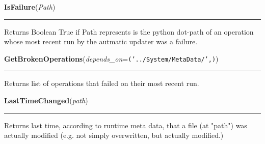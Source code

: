 \hspace{.8\funcindent}\begin{boxedminipage}{\funcwidth}

    \raggedright \textbf{IsFailure}(\textit{Path})

    \vspace{-1.5ex}

    \rule{\textwidth}{0.5\fboxrule}
\setlength{\parskip}{2ex}
    Returns Boolean True if Path represents is the python dot-path of an 
    operation whose most recent run by the autmatic updater was a failure.

\setlength{\parskip}{1ex}
    \end{boxedminipage}

    \label{System:MetaData:GetBrokenOperations}

    \vspace{0.5ex}

\hspace{.8\funcindent}\begin{boxedminipage}{\funcwidth}

    \raggedright \textbf{GetBrokenOperations}(\textit{depends\_on}={\tt ('../System/MetaData/',)})

    \vspace{-1.5ex}

    \rule{\textwidth}{0.5\fboxrule}
\setlength{\parskip}{2ex}
    Returns list of operations that failed on their most recent run.

\setlength{\parskip}{1ex}
    \end{boxedminipage}

    \label{System:MetaData:LastTimeChanged}

    \vspace{0.5ex}

\hspace{.8\funcindent}\begin{boxedminipage}{\funcwidth}

    \raggedright \textbf{LastTimeChanged}(\textit{path})

    \vspace{-1.5ex}

    \rule{\textwidth}{0.5\fboxrule}
\setlength{\parskip}{2ex}
    Returns last time, according to runtime meta data, that a  file (at 
    "path") was actually modified (e.g. not simply overwritten, but 
    actually modified.)

\setlength{\parskip}{1ex}
    \end{boxedminipage}

